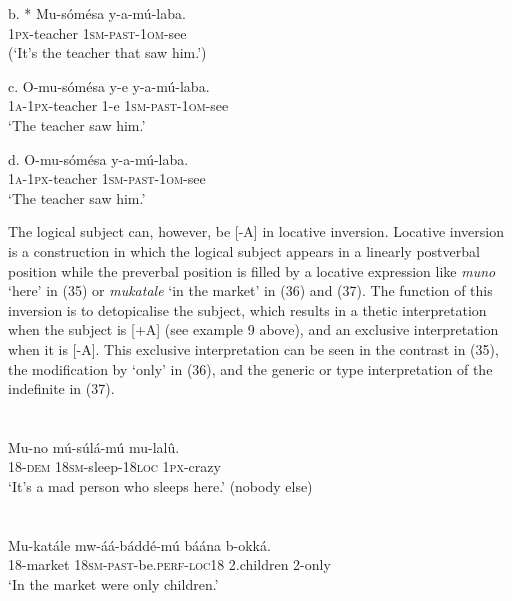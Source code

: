 \documentclass[output=paper]{langsci/langscibook}
\begin{document}
\gll   b.  * Mu-sómésa  y-a-mú-laba.\\
         \textsc{1px}{}-teacher  \textsc{1sm}{}-\textsc{past}{}-\textsc{1om}{}-see\\
\glt     (‘It’s the teacher that saw him.’)
\z

\gll   c.  O-mu-sómésa  y-e  y-a-mú-laba.\\
         \textsc{1a}{}-\textsc{1px}{}-teacher  1-e  \textsc{1sm}{}-\textsc{past}{}-\textsc{1om}{}-see\\
\glt     ‘The teacher saw him.’
\z

\gll   d.  O-mu-sómésa  y-a-mú-laba.\\
         \textsc{1a}{}-\textsc{1px}{}-teacher  \textsc{1sm}{}-\textsc{past}{}-\textsc{1om}{}-see\\
\glt     ‘The teacher saw him.’
\z

The logical subject can, however, be [-A] in locative inversion. Locative inversion is a construction in which the logical subject appears in a linearly postverbal position while the preverbal position is filled by a locative expression like \textit{muno} ‘here’ in (35) or \textit{mukatale} ‘in the market’ in (36) and (37). The function of this inversion is to detopicalise the subject, which results in a thetic interpretation when the subject is [+A] (see example 9 above), and an exclusive interpretation when it is [-A]. This exclusive interpretation can be seen in the contrast in (35), the modification by ‘only’ in (36), and the generic or type interpretation of the indefinite in (37).

\chapter{}
\gll   Mu-no    mú-súlá-mú    mu-lalû.\\
       18-\textsc{dem}  \textsc{18sm}{}-sleep-\textsc{18loc}  \textsc{1px}{}-crazy\\
\glt   ‘It’s a mad person who sleeps here.’ (nobody else)
\z

\chapter[  ]{  }
\gll   Mu-katále  mw-áá-báddé-mú      báána    b-okká.\\
       18-market  \textsc{18sm}{}-\textsc{past}{}-be.\textsc{perf}{}-\textsc{loc18}  2.children  2-only\\
\glt   ‘In the market were only children.’
\z
\end{document}
